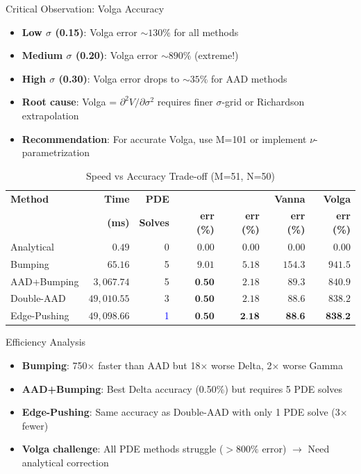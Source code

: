 \begin{alertblock}{Critical Observation: Volga Accuracy}
\begin{itemize}
    \item \textbf{Low $\sigma$ (0.15)}: Volga error $\sim130\%$ for all methods
    \item \textbf{Medium $\sigma$ (0.20)}: Volga error $\sim890\%$ (extreme!)
    \item \textbf{High $\sigma$ (0.30)}: Volga error drops to $\sim35\%$ for AAD methods
    \item \textbf{Root cause}: Volga = $\partial^2 V/\partial\sigma^2$ requires finer $\sigma$-grid or Richardson extrapolation
    \item \textbf{Recommendation}: For accurate Volga, use M=101 or implement $\nu$-parametrization
\end{itemize}
\end{alertblock}


\begin{table}[h]
\centering
\caption{Speed vs Accuracy Trade-off (M=51, N=50)}
\label{tab:speed_accuracy_tradeoff}
\begin{tabular}{lrrrrrr}
\toprule
\textbf{Method} & \textbf{Time} & \textbf{PDE} & \boldmath{$\Delta$} & \boldmath{$\Gamma$} & \textbf{Vanna} & \textbf{Volga} \\
                & \textbf{(ms)} & \textbf{Solves} & \textbf{err (\%)} & \textbf{err (\%)} & \textbf{err (\%)} & \textbf{err (\%)} \\
\midrule
Analytical       & $0.49$      & 0 & $0.00$ & $0.00$ & $0.00$ & $0.00$ \\
Bumping          & $65.16$     & 5 & $9.01$ & $5.18$ & $154.3$ & $941.5$ \\
AAD+Bumping      & $3{,}067.74$ & 5 & $\textbf{0.50}$ & $2.18$ & $89.3$ & $840.9$ \\
Double-AAD       & $49{,}010.55$ & 3 & $\textbf{0.50}$ & $2.18$ & $88.6$ & $838.2$ \\
Edge-Pushing     & $49{,}098.66$ & \textcolor{blue}{1} & $\textbf{0.50}$ & $\textbf{2.18}$ & $\textbf{88.6}$ & $\textbf{838.2}$ \\
\bottomrule
\end{tabular}
\end{table}

\begin{block}{Efficiency Analysis}
\begin{itemize}
    \item \textbf{Bumping}: 750$\times$ faster than AAD but 18$\times$ worse Delta, 2$\times$ worse Gamma
    \item \textbf{AAD+Bumping}: Best Delta accuracy (0.50\%) but requires 5 PDE solves
    \item \textbf{Edge-Pushing}: Same accuracy as Double-AAD with only 1 PDE solve (3$\times$ fewer)
    \item \textbf{Volga challenge}: All PDE methods struggle ($>800\%$ error) $\rightarrow$ Need analytical correction
\end{itemize}
\end{block}
